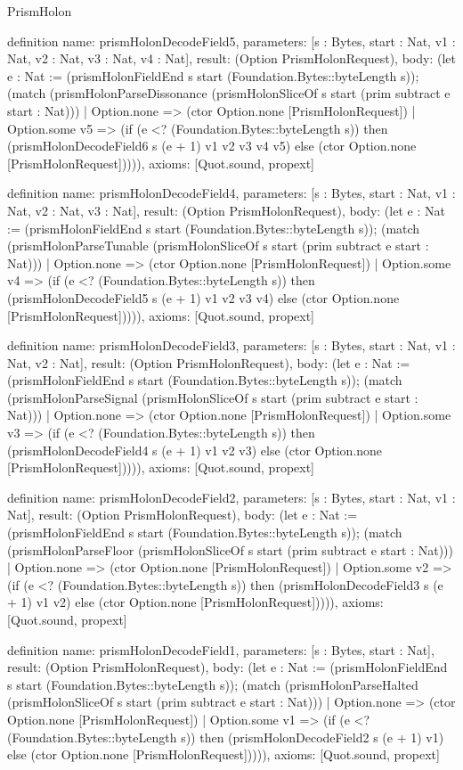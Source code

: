 \begin{lexlean}{PrismHolon}
\begin{semanticmodule}
definition{
  name: prismHolonDecodeField5,
  parameters: [s : Bytes, start : Nat, v1 : Nat, v2 : Nat, v3 : Nat, v4 : Nat],
  result: (Option PrismHolonRequest),
  body: (let e : Nat := (prismHolonFieldEnd s start (Foundation.Bytes::byteLength s)); (match (prismHolonParseDissonance (prismHolonSliceOf s start (prim subtract e start : Nat)))
    | Option.none => (ctor Option.none [PrismHolonRequest])
    | Option.some v5 => (if (e <? (Foundation.Bytes::byteLength s)) then (prismHolonDecodeField6 s (e + 1) v1 v2 v3 v4 v5) else (ctor Option.none [PrismHolonRequest])))),
  axioms: [Quot.sound, propext]
}

definition{
  name: prismHolonDecodeField4,
  parameters: [s : Bytes, start : Nat, v1 : Nat, v2 : Nat, v3 : Nat],
  result: (Option PrismHolonRequest),
  body: (let e : Nat := (prismHolonFieldEnd s start (Foundation.Bytes::byteLength s)); (match (prismHolonParseTunable (prismHolonSliceOf s start (prim subtract e start : Nat)))
    | Option.none => (ctor Option.none [PrismHolonRequest])
    | Option.some v4 => (if (e <? (Foundation.Bytes::byteLength s)) then (prismHolonDecodeField5 s (e + 1) v1 v2 v3 v4) else (ctor Option.none [PrismHolonRequest])))),
  axioms: [Quot.sound, propext]
}

definition{
  name: prismHolonDecodeField3,
  parameters: [s : Bytes, start : Nat, v1 : Nat, v2 : Nat],
  result: (Option PrismHolonRequest),
  body: (let e : Nat := (prismHolonFieldEnd s start (Foundation.Bytes::byteLength s)); (match (prismHolonParseSignal (prismHolonSliceOf s start (prim subtract e start : Nat)))
    | Option.none => (ctor Option.none [PrismHolonRequest])
    | Option.some v3 => (if (e <? (Foundation.Bytes::byteLength s)) then (prismHolonDecodeField4 s (e + 1) v1 v2 v3) else (ctor Option.none [PrismHolonRequest])))),
  axioms: [Quot.sound, propext]
}

definition{
  name: prismHolonDecodeField2,
  parameters: [s : Bytes, start : Nat, v1 : Nat],
  result: (Option PrismHolonRequest),
  body: (let e : Nat := (prismHolonFieldEnd s start (Foundation.Bytes::byteLength s)); (match (prismHolonParseFloor (prismHolonSliceOf s start (prim subtract e start : Nat)))
    | Option.none => (ctor Option.none [PrismHolonRequest])
    | Option.some v2 => (if (e <? (Foundation.Bytes::byteLength s)) then (prismHolonDecodeField3 s (e + 1) v1 v2) else (ctor Option.none [PrismHolonRequest])))),
  axioms: [Quot.sound, propext]
}

definition{
  name: prismHolonDecodeField1,
  parameters: [s : Bytes, start : Nat],
  result: (Option PrismHolonRequest),
  body: (let e : Nat := (prismHolonFieldEnd s start (Foundation.Bytes::byteLength s)); (match (prismHolonParseHalted (prismHolonSliceOf s start (prim subtract e start : Nat)))
    | Option.none => (ctor Option.none [PrismHolonRequest])
    | Option.some v1 => (if (e <? (Foundation.Bytes::byteLength s)) then (prismHolonDecodeField2 s (e + 1) v1) else (ctor Option.none [PrismHolonRequest])))),
  axioms: [Quot.sound, propext]
}


\end{semanticmodule}
\end{lexlean}
